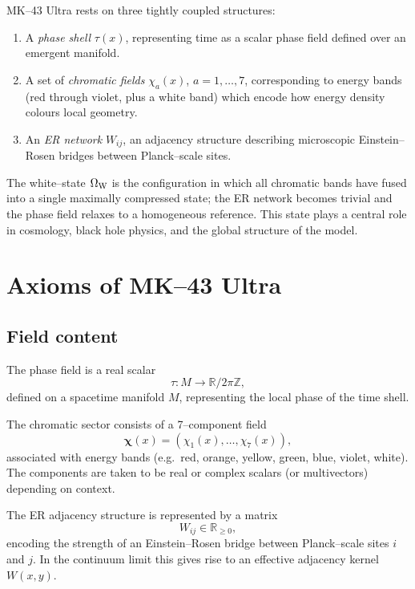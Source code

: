 MK--43 Ultra rests on three tightly coupled structures:
\begin{enumerate}[label=(\alph*)]
  \item A \emph{phase shell} $\tau(x)$, representing time as a scalar phase field defined over an emergent manifold.
  \item A set of \emph{chromatic fields} $\chi_a(x)$, $a=1,\dots,7$, corresponding to energy bands (red through violet, plus a white band) which encode how energy density colours local geometry.
  \item An \emph{ER network} $W_{ij}$, an adjacency structure describing microscopic Einstein--Rosen bridges between Planck--scale sites.
\end{enumerate}

The white--state $\Omega_{\mathrm{W}}$ is the configuration in which all chromatic bands have fused into a single maximally compressed state; the ER network becomes trivial and the phase field relaxes to a homogeneous reference.
This state plays a central role in cosmology, black hole physics, and the global structure of the model.

\chapter{Axioms of MK--43 Ultra}

\section{Field content}

\begin{definition}
The phase field is a real scalar
\[
  \tau : M \to \mathbb{R}/2\pi\mathbb{Z},
\]
defined on a spacetime manifold $M$, representing the local phase of the time shell.
\end{definition}

\begin{definition}
The chromatic sector consists of a 7--component field
\[
  \bm{\chi}(x) = (\chi_1(x),\dots,\chi_7(x)),
\]
associated with energy bands (e.g.\ red, orange, yellow, green, blue, violet, white).
The components are taken to be real or complex scalars (or multivectors) depending on context.
\end{definition}

\begin{definition}[ER network]
The ER adjacency structure is represented by a matrix
\[
  W_{ij} \in \mathbb{R}_{\ge 0},
\]
encoding the strength of an Einstein--Rosen bridge between Planck--scale sites $i$ and $j$.
In the continuum limit this gives rise to an effective adjacency kernel $W(x,y)$.
\end{definition}

